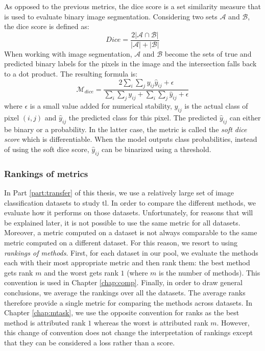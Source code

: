 As opposed to the previous metrics, the dice score is a set similarity measure
that is used to evaluate binary image segmentation. Considering two sets $\mathcal{A}$
and $\mathcal{B}$, the dice score is defined as:
\begin{equation}
\label{eqn:backml:diceAB}
Dice = \frac{2 \left|\mathcal{A}\cap \mathcal{B}\right|}{\left|\mathcal{A}\right| + \left|\mathcal{B}\right|}
\end{equation}
When working with image segmentation, $\mathcal{A}$ and $\mathcal{B}$ become the
sets of true and predicted binary labels for the pixels in the image and the
intersection falls back to a dot product. The resulting formula is:
\begin{equation}
\label{eqn:backml:dice}
\mathcal{M}_{dice} = \dfrac{2 \sum_i\sum_j y_{ij} \hat{y}_{ij} + \epsilon}{\sum_i\sum_j y_{ij} + \sum_i\sum_j \hat{y}_{ij} + \epsilon}
\end{equation}
where $\epsilon$ is a small value added for numerical stability, $y_{ij}$ is the
actual class of pixel $(i, j)$ and $\hat{y}_{ij}$ the predicted class for this
pixel. The predicted $\hat{y}_{ij}$ can either be binary or a probability. In the
latter case, the metric is called the \textit{soft dice score} which is differentiable.
When the model outputs class probabilities, instead of using the soft dice score,
$\hat{y}_{ij}$ can be binarized using a threshold.

\subsubsection{Rankings of metrics}
\label{ssec:backml:metric:rankings}

In Part \ref{part:transfer} of this thesis, we use a relatively large set of image
classification datasets to study \acrlong{tl}. In order to compare the different
methods, we evaluate how it performs on those datasets. Unfortunately, for reasons
that will be explained later, it is not possible to use the same metric for all
datasets. Moreover, a metric computed on a dataset is not always comparable to
the same metric computed on a different dataset. For this reason, we resort to
using \textit{rankings of methods}. First, for each dataset in our pool, we evaluate
the methods each with their most appropriate metric and then rank them: the best
method gets rank $m$ and the worst gets rank $1$ (where $m$ is the number of methods). This 
convention is used in Chapter \ref{chap:comp}. Finally, in order to draw general 
conclusions, we average the rankings over all the datasets. The average ranks therefore 
provide a single metric for comparing
the methods across datasets. In Chapter \ref{chap:mtask}, we use the opposite convention 
for ranks as the best method is attributed rank $1$ whereas the worst is attributed rank $m$.
However, this change of convention does not change the interpretation of rankings except 
that they can be considered a loss rather than a score. 

